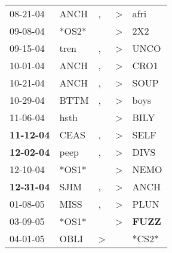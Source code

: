 \begin{supertabular}{p{0.07\textwidth}p{0.06\textwidth}p{0.02\textwidth}p{0.02\textwidth}p{0.06\textwidth}}
          08-21-04\textsuperscript{} &           ANCH\textsuperscript{} &                , &     \textgreater &           afri\textsuperscript{} \\
          09-08-04\textsuperscript{} &                            *OS2* &                  &     \textgreater &            2X2\textsuperscript{} \\
          09-15-04\textsuperscript{} &           tren\textsuperscript{} &                , &     \textgreater &           UNCO\textsuperscript{} \\
          10-01-04\textsuperscript{} &           ANCH\textsuperscript{} &                , &     \textgreater &           CRO1\textsuperscript{} \\
          10-21-04\textsuperscript{} &           ANCH\textsuperscript{} &                , &     \textgreater &           SOUP\textsuperscript{} \\
          10-29-04\textsuperscript{} &           BTTM\textsuperscript{} &                , &     \textgreater &           boys\textsuperscript{} \\
          11-06-04\textsuperscript{} &           hsth\textsuperscript{} &                  &     \textgreater &           BILY\textsuperscript{} \\
 \textbf{11-12-04\textsuperscript{}} &           CEAS\textsuperscript{} &                , &     \textgreater &           SELF\textsuperscript{} \\
 \textbf{12-02-04\textsuperscript{}} &           peep\textsuperscript{} &                , &     \textgreater &           DIVS\textsuperscript{} \\
          12-10-04\textsuperscript{} &                            *OS1* &                  &     \textgreater &           NEMO\textsuperscript{} \\
 \textbf{12-31-04\textsuperscript{}} &           SJIM\textsuperscript{} &                , &     \textgreater &           ANCH\textsuperscript{} \\
          01-08-05\textsuperscript{} &           MISS\textsuperscript{} &                , &     \textgreater &           PLUN\textsuperscript{} \\
          03-09-05\textsuperscript{} &                            *OS1* &                  &     \textgreater &  \textbf{FUZZ\textsuperscript{}} \\
          04-01-05\textsuperscript{} &           OBLI\textsuperscript{} &     \textgreater &                  &                            *CS2* \\

\end{supertabular}
